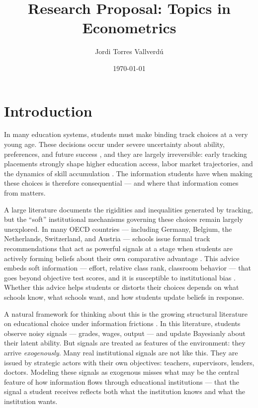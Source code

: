 \documentclass{article}
\title{Research Proposal: Topics in Econometrics}
\author{Jordi Torres Vallverdú}
\date{\today}
\begin{document}
\maketitle
\vspace{-2em}


\section{Introduction}

In many education systems, students must make binding track choices at a very 
young age. These decisions occur under severe uncertainty about ability, 
preferences, and future success \citep{betts2011economics, dustmann2017returns, 
giustinelli2017evolution}, and they are largely irreversible: early tracking 
placements strongly shape higher education access, labor market trajectories, 
and the dynamics of skill accumulation \citep{hanushek2006does, dustmann2017returns, 
de_groote_dynamic_2025, humphries_joensen_veramendi_2025_complementarities}. 
The information students have when making these choices is therefore consequential 
--- and where that information comes from matters.

A large literature documents the rigidities and inequalities generated by 
tracking, but the ``soft'' institutional mechanisms governing these choices 
remain largely unexplored. In many OECD countries --- including Germany, Belgium, 
the Netherlands, Switzerland, and Austria --- schools issue formal track 
recommendations that act as powerful signals at a stage when students are 
actively forming beliefs about their own comparative advantage 
\citep{piopiunik2015teacher, Papageorge2020Expectations, giustinelli2017evolution}. 
This advice embeds soft information --- effort, relative class rank, classroom 
behavior --- that goes beyond objective test scores, and it is susceptible to 
institutional bias \citep{carlana_implicit_2019, brunello2025teacher}. Whether 
this advice helps students or distorts their choices depends on what schools 
know, what schools want, and how students update beliefs in response.

A natural framework for thinking about this is the growing structural literature 
on educational choice under information frictions 
\citep{stinebrickner2012learning, stinebrickner2014academic, larroucau2024dynamic, 
arcidiacono2025college}. In this literature, students observe noisy signals --- 
grades, wages, output --- and update Bayesianly about their latent ability. 
But signals are treated as features of the environment: they arrive 
\emph{exogenously}. Many real institutional signals are not like this. They 
are issued by strategic actors with their own objectives: teachers, supervisors, 
lenders, doctors. Modeling these signals as exogenous misses what may be the 
central feature of how information flows through educational institutions --- 
that the signal a student receives reflects both what the institution knows 
and what the institution wants.
\end{document}
